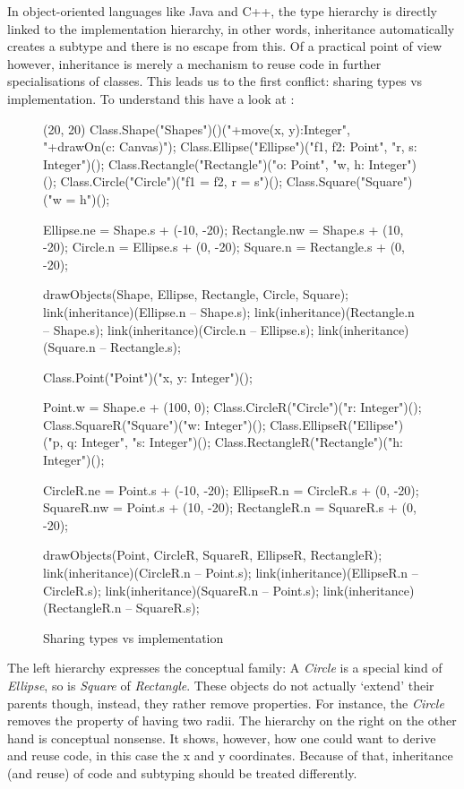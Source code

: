 In object-oriented languages like Java and C++, the type hierarchy
is directly linked to the implementation hierarchy, in other words,
inheritance automatically creates a subtype and there is no escape from
this. Of a practical point of view however, inheritance is merely a
mechanism to reuse code in further specialisations of classes. This
leads us to the first conflict: sharing types vs implementation. To understand this have a look at
 \cite{simons_theory_2003-4}:

\begin{figure}[H]
	\centering
	\begin{emp}[classdiag](20, 20)
		Class.Shape("Shapes")()("+move(x, y):Integer", "+drawOn(c: Canvas)");
		Class.Ellipse("Ellipse")("f1, f2: Point", "r, s: Integer")();
		Class.Rectangle("Rectangle")("o: Point", "w, h: Integer")();
		Class.Circle("Circle")("{f1 = f2, r = s}")();
		Class.Square("Square")("{w = h}")();

		Ellipse.ne = Shape.s + (-10, -20);
		Rectangle.nw = Shape.s + (10, -20);
		Circle.n = Ellipse.s + (0, -20);
		Square.n = Rectangle.s + (0, -20);

		drawObjects(Shape, Ellipse, Rectangle, Circle, Square);
		link(inheritance)(Ellipse.n -- Shape.s);
		link(inheritance)(Rectangle.n -- Shape.s);
		link(inheritance)(Circle.n -- Ellipse.s);
		link(inheritance)(Square.n -- Rectangle.s);

		Class.Point("Point")("x, y: Integer")();

		Point.w = Shape.e + (100, 0);
		Class.CircleR("Circle")("r: Integer")();
		Class.SquareR("Square")("w: Integer")();
		Class.EllipseR("Ellipse")("p, q: Integer", "s: Integer")();
		Class.RectangleR("Rectangle")("h: Integer")();

		CircleR.ne = Point.s + (-10, -20);
		EllipseR.n = CircleR.s + (0, -20);
		SquareR.nw = Point.s + (10, -20);
		RectangleR.n = SquareR.s + (0, -20);

		drawObjects(Point, CircleR, SquareR, EllipseR, RectangleR);
		link(inheritance)(CircleR.n -- Point.s);
		link(inheritance)(EllipseR.n -- CircleR.s);
		link(inheritance)(SquareR.n -- Point.s);
		link(inheritance)(RectangleR.n -- SquareR.s);
	\end{emp}
	\caption{Sharing types vs implementation}
	\label{fig:implementationConflict}
\end{figure}

The left hierarchy expresses the conceptual family: A \emph{Circle}
is a special kind of \emph{Ellipse}, so is \emph{Square} of
\emph{Rectangle}. These objects do not actually `extend' their parents
though, instead, they rather remove properties. For instance, the
\emph{Circle} removes the property of having two radii. The hierarchy on
the right on the other hand is conceptual nonsense. It shows, however,
how one could want to derive and reuse code, in this case the x and
y coordinates. Because of that, inheritance (and reuse) of code and
subtyping should be treated differently.

